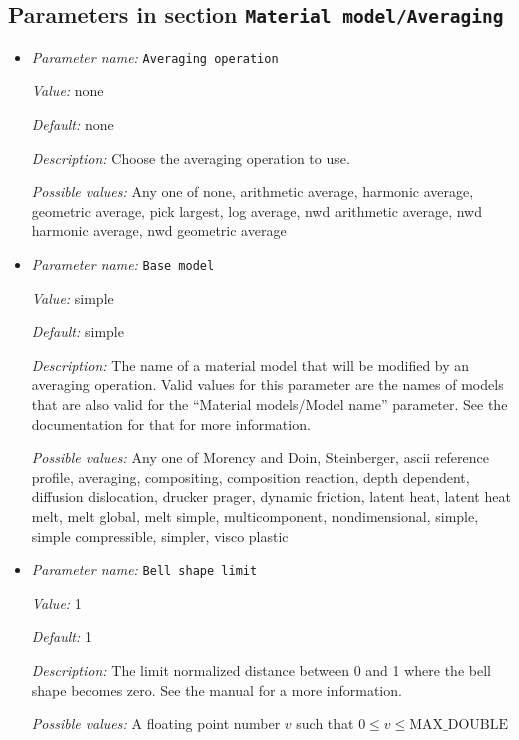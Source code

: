 \subsection{Parameters in section \tt Material model/Averaging}
\label{parameters:Material_20model/Averaging}

\begin{itemize}
\item {\it Parameter name:} {\tt Averaging operation}
\label{parameters:Material model/Averaging/Averaging operation}


{\it Value:} none


{\it Default:} none


{\it Description:} Choose the averaging operation to use.


{\it Possible values:} Any one of none, arithmetic average, harmonic average, geometric average, pick largest, log average, nwd arithmetic average, nwd harmonic average, nwd geometric average
\item {\it Parameter name:} {\tt Base model}
\label{parameters:Material model/Averaging/Base model}


{\it Value:} simple


{\it Default:} simple


{\it Description:} The name of a material model that will be modified by an averaging operation. Valid values for this parameter are the names of models that are also valid for the ``Material models/Model name'' parameter. See the documentation for that for more information.


{\it Possible values:} Any one of Morency and Doin, Steinberger, ascii reference profile, averaging, compositing, composition reaction, depth dependent, diffusion dislocation, drucker prager, dynamic friction, latent heat, latent heat melt, melt global, melt simple, multicomponent, nondimensional, simple, simple compressible, simpler, visco plastic
\item {\it Parameter name:} {\tt Bell shape limit}
\label{parameters:Material model/Averaging/Bell shape limit}


{\it Value:} 1


{\it Default:} 1


{\it Description:} The limit normalized distance between 0 and 1 where the bell shape becomes zero. See the manual for a more information.


{\it Possible values:} A floating point number $v$ such that $0 \leq v \leq \text{MAX\_DOUBLE}$
\end{itemize}


